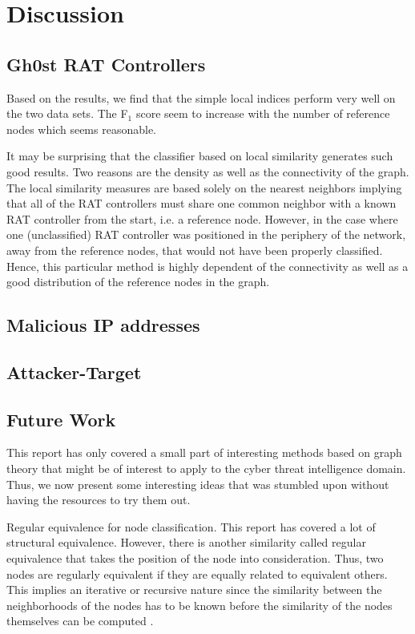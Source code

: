 \chapter{Discussion}

\section{Gh0st RAT Controllers}
Based on the results, we find that the simple local indices perform very well on the two data sets. The F$_1$ score seem to increase with the number of reference nodes which seems reasonable. 

It may be surprising that the classifier based on local similarity generates such good results. Two reasons are the density as well as the connectivity of the graph. The local similarity measures are based solely on the nearest neighbors implying that all of the RAT controllers must share one common neighbor with a known RAT controller from the start, i.e. a reference node. However, in the case where one (unclassified) RAT controller was positioned in the periphery of the network, away from the reference nodes, that would not have been properly classified. Hence, this particular method is highly dependent of the connectivity as well as a good distribution of the reference nodes in the graph. 

\section{Malicious IP addresses}

\section{Attacker-Target}

\section{Future Work}
This report has only covered a small part of interesting methods based on graph theory that might be of interest to apply to the cyber threat intelligence domain. Thus, we now present some interesting ideas that was stumbled upon without having the resources to try them out. 

Regular equivalence for node classification. This report has covered a lot of structural equivalence. However, there is another similarity called regular equivalence that takes the position of the node into consideration. Thus, two nodes are regularly equivalent if they are equally related to equivalent others. This implies an iterative or recursive nature since the similarity between the neighborhoods of the nodes has to be known before the similarity of the nodes themselves can be computed \cite{leicht2006}. 

